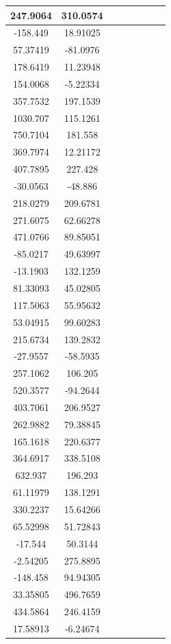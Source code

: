 \documentclass[preprint,review,11pt]{elsarticle}
\begin{document}
\begin{longtable}{|c|c|c|c|c|c|c|c|}
		247.9064 & 310.0574 \\ \hline
		-158.449 & 18.91025 \\ \hline
		57.37419 & -81.0976 \\ \hline
		178.6419 & 11.23948 \\ \hline
		154.0068 & -5.22334 \\ \hline
		357.7532 & 197.1539 \\ \hline
		1030.707 & 115.1261 \\ \hline
		750.7104 & 181.558  \\ \hline
		369.7974 & 12.21172 \\ \hline
		407.7895 & 227.428  \\ \hline
		-30.0563 & -48.886  \\ \hline
		218.0279 & 209.6781 \\ \hline
		271.6075 & 62.66278 \\ \hline
		471.0766 & 89.85051 \\ \hline
		-85.0217 & 49.63997 \\ \hline
		-13.1903 & 132.1259 \\ \hline
		81.33093 & 45.02805 \\ \hline
		117.5063 & 55.95632 \\ \hline
		53.04915 & 99.60283 \\ \hline
		215.6734 & 139.2832 \\ \hline
		-27.9557 & -58.5935 \\ \hline
		257.1062 & 106.205  \\ \hline
		520.3577 & -94.2644 \\ \hline
		403.7061 & 206.9527 \\ \hline
		262.9882 & 79.38845 \\ \hline
		165.1618 & 220.6377 \\ \hline
		364.6917 & 338.5108 \\ \hline
		632.937  & 196.293  \\ \hline
		61.11979 & 138.1291 \\ \hline
		330.2237 & 15.64266 \\ \hline
		65.52998 & 51.72843 \\ \hline
		-17.544  & 50.3144  \\ \hline
		-2.54205 & 275.8895 \\ \hline
		-148.458 & 94.94305 \\ \hline
		33.35805 & 496.7659 \\ \hline
		434.5864 & 246.4159 \\ \hline
		17.58913 & -6.24674 \\ \hline

\end{longtable}
\end{document}
